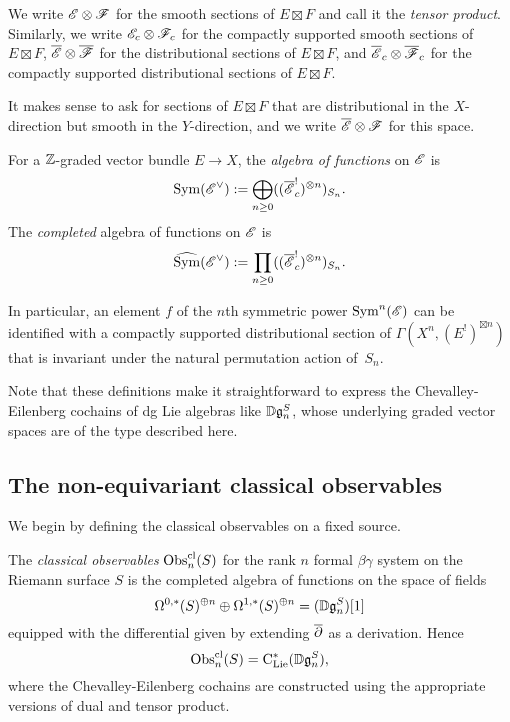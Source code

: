 \begin{dfn}
We write $\mathscr E \otimes \mathscr F$ for the smooth sections of $E \boxtimes F$ and call it the \emph{tensor product}.
Similarly, we write 
$\mathscr E_c \otimes \mathscr F_c$ for the compactly supported smooth sections of $E \boxtimes F$,
$\overline{\mathscr E} \otimes \overline{\mathscr F}$ for the distributional sections of $E \boxtimes F$, and
$\overline{\mathscr E}_c \otimes \overline{\mathscr F}_c$ for the compactly supported distributional sections of $E \boxtimes F$.
\end{dfn}

It makes sense to ask for sections of $E \boxtimes F$ that are distributional in the $X$-direction but smooth in the $Y$-direction,
and we write $\overline{\mathscr E} \otimes \mathscr F$ for this space.

\begin{dfn}
For a $\mathbb Z$-graded vector bundle $E \to X$, the {\em algebra of functions} on $\mathscr E$ is
\[
{\rm Sym}(\mathscr E^\vee) := \bigoplus_{n \geq 0} ((\overline{\mathscr E}_c^!)^{\otimes n})_{S_n}.
\]
The {\em completed} algebra of functions on $\mathscr E$ is
\[
\widehat{{\rm Sym}}(\mathscr E^\vee) := \prod_{n \geq 0} ((\overline{\mathscr E}_c^!)^{\otimes n})_{S_n}.
\]
\end{dfn}

In particular, an element $f$ of the $n$th symmetric power ${\rm Sym}^n(\mathscr E)$ 
can be identified with a compactly supported distributional section of $\Gamma(X^n, (E^!)^{\boxtimes n})$
that is invariant under the natural permutation action of~$S_n$.

Note that these definitions make it straightforward to express the Chevalley-Eilenberg cochains
of dg Lie algebras like $\mathbb D\mathfrak{g}_n^S$, whose underlying graded vector spaces are of the type described here.

\subsection{The non-equivariant classical observables}

We begin by defining the classical observables on a fixed source.

\begin{dfn}
The \emph{classical observables} ${\rm Obs}^{{\rm cl}}_n(S)$ 
for the rank $n$ formal $\beta\gamma$ system on the Riemann surface $S$ 
is the completed algebra of functions on the space of fields
\[
\Omega^{0,*}(S)^{\oplus n} \oplus \Omega^{1,*}(S)^{\oplus n} = (\mathbb D \mathfrak{g}_n^S)[1]
\]
equipped with the differential given by extending $\overline{\partial}$ as a derivation.
Hence
\[
{\rm Obs}^{{\rm cl}}_n(S) = {\rm C}_{\rm Lie}^*(\mathbb D \mathfrak{g}_n^S),
\]
where the Chevalley-Eilenberg cochains are constructed using the appropriate versions of dual and tensor product.
\end{dfn}

